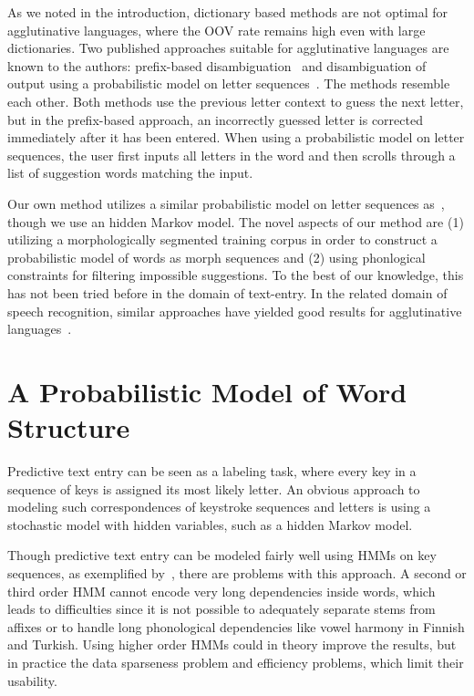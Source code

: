 \documentclass{llncs}
\begin{document}
As we noted in the introduction, dictionary based methods are not
optimal for agglutinative languages, where the OOV rate remains high
even with large dictionaries. Two published approaches suitable for
agglutinative languages are known to the authors: prefix-based
disambiguation~\cite{Mackenzie01letterwise:prefix-based} and
disambiguation of output using a probabilistic model on letter
sequences~\cite{Tantug:2010}. The methods resemble each other. Both
methods use the previous letter context to guess the next letter, but
in the prefix-based approach, an incorrectly guessed letter is
corrected immediately after it has been entered. When using a
probabilistic model on letter sequences, the user first inputs all
letters in the word and then scrolls through a list of suggestion
words matching the input.

Our own method utilizes a similar probabilistic model on letter
sequences as~\cite{Tantug:2010}, though we use an hidden Markov
model. The novel aspects of our method are (1) utilizing a
morphologically segmented training corpus in order to construct a
probabilistic model of words as morph sequences and (2) using
phonlogical constraints for filtering impossible suggestions. To the
best of our knowledge, this has not been tried before in the domain of
text-entry. In the related domain of speech recognition, similar
approaches have yielded good results for agglutinative
languages~\cite{Creutz_morph-basedspeech}.

\section{A Probabilistic Model of Word Structure}\label{model}

Predictive text entry can be seen as a labeling task, where every key
in a sequence of keys is assigned its most likely letter. An obvious
approach to modeling such correspondences of keystroke sequences and
letters is using a stochastic model with hidden variables, such as a
hidden Markov model.

Though predictive text entry can be modeled fairly well using HMMs on
key sequences, as exemplified by~\cite{Tantug:2010}, there are
problems with this approach. A second or third order HMM cannot encode
very long dependencies inside words, which leads to difficulties since
it is not possible to adequately separate stems from affixes or to
handle long phonological dependencies like vowel harmony in Finnish
and Turkish. Using higher order HMMs could in theory improve the
results, but in practice the data sparseness problem and efficiency
problems, which limit their usability.
\end{document}
